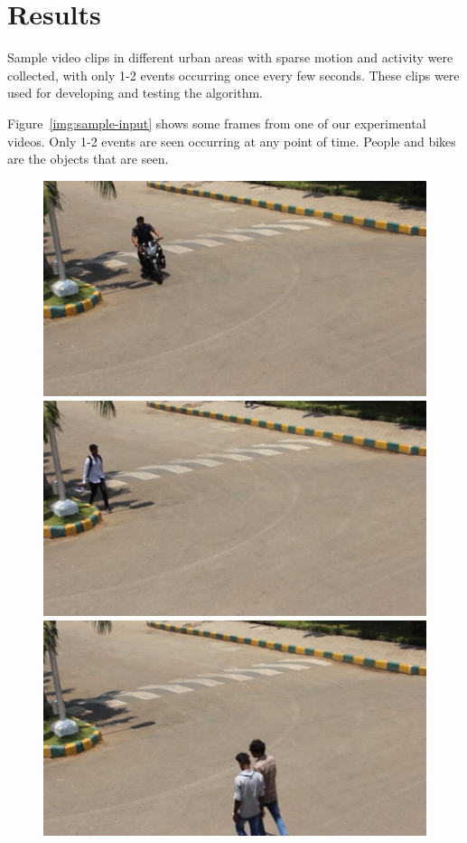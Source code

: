 \documentclass[conference]{IEEEtran}
\begin{document}
\section{Results}
Sample video clips in different urban areas with sparse motion and activity were
collected, with only 1-2 events occurring once every few seconds. These clips
were used for developing and testing the algorithm.

Figure~\ref{img:sample-input} shows some frames from one of our experimental
videos. Only 1-2 events are seen occurring at any point of time. People and
bikes are the objects that are seen.

\begin{figure}[!htb]
        \includegraphics[width=\linewidth]{sample-input-1.png}
    \endminipage\hfill
        \includegraphics[width=\linewidth]{sample-input-2.png}
    \endminipage\hfill
        \includegraphics[width=\linewidth]{sample-input-3.png}

\end{figure}
\end{document}
